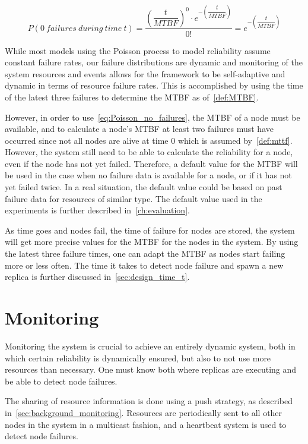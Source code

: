 \documentclass{cslthse-msc}
\begin{document}
\begin{equation} \label{eq:Poisson_no_failures}
P(0\ failures\ during\ time\ t) = \dfrac{\left(\dfrac{t}{MTBF}\right)^0 \cdot e^{-\left(\dfrac{t}{MTBF}\right)}}{0!} = e^{-\left(\dfrac{t}{MTBF}\right)}
\end{equation}

While most models using the Poisson process to model reliability assume constant failure rates, our failure distributions are dynamic and monitoring of the system resources and events allows for the framework to be self-adaptive and dynamic in terms of resource failure rates. This is accomplished by using the time of the latest three failures to determine the MTBF as of~\cref{def:MTBF}. 

However, in order to use~\cref{eq:Poisson_no_failures}, the MTBF of a node must be available, and to calculate a node's MTBF at least two failures must have occurred since not all nodes are alive at time 0 which is assumed by~\cref{def:mttf}. However, the system still need to be able to calculate the reliability for a node, even if the node has not yet failed. Therefore, a default value for the MTBF will be used in the case when no failure data is available for a node, or if it has not yet failed twice. In a real situation, the default value could be based on past failure data for resources of similar type. The default value used in the experiments is further described in~\cref{ch:evaluation}.

As time goes and nodes fail, the time of failure for nodes are stored, the system will get more precise values for the MTBF for the nodes in the system. By using the latest three failure times, one can adapt the MTBF as nodes start failing more or less often. The time it takes to detect node failure and spawn a new replica is further discussed in~\cref{sec:design_time_t}.


\section{Monitoring} \label{sec:design_monitoring}
Monitoring the system is crucial to achieve an entirely dynamic system, both in which certain reliability is dynamically ensured, but also to not use more resources than necessary. One must know both where replicas are executing and be able to detect node failures.

The sharing of resource information is done using a push strategy, as described in~\cref{sec:background_monitoring}. Resources are periodically sent to all other nodes in the system in a multicast fashion, and a heartbeat system is used to detect node failures.
\end{document}
